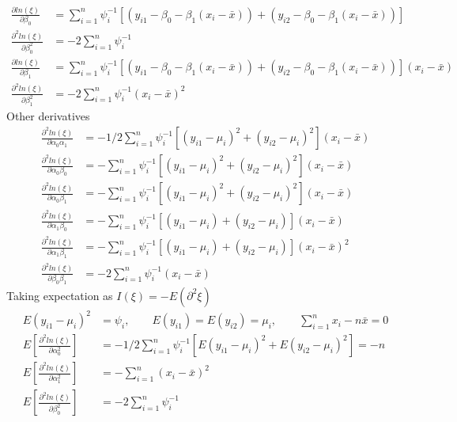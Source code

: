 \documentclass[11pt]{article} %
\begin{document}
\begin{itemize}
\begin{align*}
	\end{align*}
	\begin{align*}
		\frac{ \partial ln(\xi)}{\partial \beta_0} &=  \sum_{i=1}^n \psi_i^{-1} [(y_{i1}-\beta_0-\beta_1(x_i-\bar{x})) + (y_{i2}-\beta_0-\beta_1(x_i-\bar{x}))] \\
		\frac{ \partial^2 ln(\xi)}{\partial \beta_0^2} &= - 2\sum_{i=1}^n \psi_i^{-1}
	\end{align*}
	\begin{align*}
		\frac{ \partial ln(\xi)}{\partial \beta_1} &=  \sum_{i=1}^n \psi_i^{-1} [(y_{i1}-\beta_0-\beta_1(x_i-\bar{x})) + (y_{i2}-\beta_0-\beta_1(x_i-\bar{x}))] (x_i-\bar{x})\\
		\frac{ \partial^2 ln(\xi)}{\partial \beta_1^2} &= - 2\sum_{i=1}^n \psi_i^{-1}(x_i-\bar{x})^2
	\end{align*}
	Other derivatives
	\begin{align*}
		\frac{ \partial^2 ln(\xi)}{\partial \alpha_0\alpha_1} &= -1/2  \sum_{i=1}^n \psi_i^{-1} [(y_{i1}-\mu_i)^2 + (y_{i2}-\mu_i)^2](x_i-\bar{x})\\
		\frac{ \partial^2 ln(\xi)}{\partial \alpha_0\beta_0} &= -  \sum_{i=1}^n \psi_i^{-1} [(y_{i1}-\mu_i)^2 + (y_{i2}-\mu_i)^2](x_i-\bar{x})\\
		\frac{ \partial^2 ln(\xi)}{\partial \alpha_0\beta_1} &= -  \sum_{i=1}^n \psi_i^{-1} [(y_{i1}-\mu_i)^2 + (y_{i2}-\mu_i)^2](x_i-\bar{x})\\
		\frac{ \partial^2 ln(\xi)}{\partial \alpha_1\beta_0} &= -  \sum_{i=1}^n \psi_i^{-1} [(y_{i1}-\mu_i) + (y_{i2}-\mu_i)](x_i-\bar{x})\\
		\frac{ \partial^2 ln(\xi)}{\partial \alpha_1\beta_1} &= -  \sum_{i=1}^n \psi_i^{-1} [(y_{i1}-\mu_i) + (y_{i2}-\mu_i)](x_i-\bar{x})^2\\
		\frac{ \partial^2 ln(\xi)}{\partial \beta_0\beta_1} &= - 2 \sum_{i=1}^n \psi_i^{-1} (x_i-\bar{x})
	\end{align*}
	Taking expectation as $I(\xi) = -E (\partial^2 \xi)$
	\begin{align*}
		E(y_{i1}-\mu_i)^2 &= \psi_i,\qquad E(y_{i1}) = E(y_{i2}) =\mu_i,\qquad \sum_{i=1}^n x_i- n \bar{x} = 0\\
		E[\frac{ \partial^2 ln(\xi)}{\partial \alpha_0^2}] &=-1/2  \sum_{i=1}^n \psi_i^{-1} [E(y_{i1}-\mu_i)^2 + E(y_{i2}-\mu_i)^2]=  -n\\
		E[\frac{ \partial^2 ln(\xi)}{\partial \alpha_1^2}] &= -\sum_{i=1}^n (x_i-\bar{x})^2\\
		E[\frac{ \partial^2 ln(\xi)}{\partial \beta_0^2}] &= - 2\sum_{i=1}^n \psi_i^{-1}\\

\end{align*}
\end{itemize}
\end{document}
